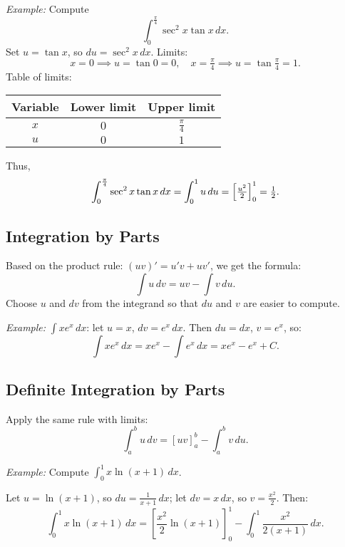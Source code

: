 \documentclass{article}
\begin{document}
\begin{multicols}{2}
\emph{Example:}
Compute
\[
\int_{0}^{\frac{\pi}{4}} \sec^2 x\tan x\,dx.
\]
Set $u=\tan x$, so $du=\sec^2 x\,dx$.  Limits:
\[
x=0\implies u=\tan0=0,
\quad x=\tfrac{\pi}{4}\implies u=\tan\tfrac{\pi}{4}=1.
\]
Table of limits:
\begin{center}
\begin{tabular}{c|cc}
Variable & Lower limit & Upper limit \\
\hline
$x$ & $0$ & $\tfrac{\pi}{4}$ \\
$u$ & $0$ & $1$
\end{tabular}
\end{center}
Thus,
\[
\int_{0}^{\frac{\pi}{4}} \sec^2 x\tan x\,dx
=\int_{0}^{1} u\,du
=\Bigl[\tfrac{u^2}{2}\Bigr]_{0}^{1}
=\tfrac{1}{2}.
\]

\subsection*{Integration by Parts}
Based on the product rule: $(uv)' = u'v + uv'$, we get the formula:
\[
\int u\,dv = uv - \int v\,du.
\]
Choose $u$ and $dv$ from the integrand so that $du$ and $v$ are easier to compute.

\emph{Example:} $\int x e^x\,dx$: let $u = x$, $dv = e^x\,dx$.
Then $du = dx$, $v = e^x$, so:
\[
\int x e^x\,dx = x e^x - \int e^x\,dx = x e^x - e^x + C.
\]

\subsection*{Definite Integration by Parts}
Apply the same rule with limits:
\[
\int_a^b u\,dv = \left[uv\right]_a^b - \int_a^b v\,du.
\]

\emph{Example:} Compute $\int_0^1 x \ln(x+1)\,dx$.

Let $u = \ln(x+1)$, so $du = \frac{1}{x+1}\,dx$;  
let $dv = x\,dx$, so $v = \frac{x^2}{2}$. Then:
\[
\int_0^1 x\ln(x+1)\,dx
= \left[\frac{x^2}{2} \ln(x+1)\right]_0^1 - \int_0^1 \frac{x^2}{2(x+1)}\,dx.
\]

\end{multicols}
\end{document}
